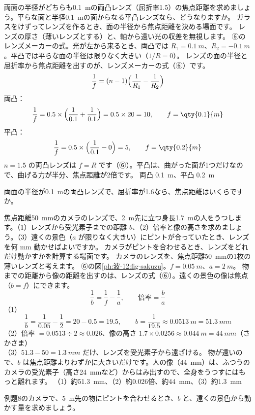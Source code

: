 \label{ph:波-12:ex7}
\begin{phreidai}[両凸レンズの焦点距離]
両面の半径がどちらも\qty{0.1}{m}の両凸レンズ（屈折率1.5）の焦点距離を求めましょう。平らな面と半径\qty{0.1}{m}の面からなる平凸レンズなら、どうなりますか。
\phbamen
ガラスをけずってレンズを作るとき、面の半径から焦点距離を決める場面です。
\phmushi
レンズの厚さ（薄いレンズとする）と、軸から遠い光の収差を無視します。
\phzu
⑥のレンズメーカーの式。光が左から来るとき、両凸では $R_1=\qty{0.1}{m}$、$R_2=\qty{-0.1}{m}$。平凸では平らな面の半径は限りなく大きい（$1/R=0$）。
\phriyu
レンズの面の半径と屈折率から焦点距離を出すのが、レンズメーカーの式（⑥）です。
\phtateru
\[\frac1f=(n-1)\Bigl(\frac1{R_1}-\frac1{R_2}\Bigr)\]
\phtoku
両凸：\[\frac1f=0.5\times\Bigl(\frac1{0.1}+\frac1{0.1}\Bigr)=0.5\times20=10,\qquad f=\qty{0.1}{m}\]
平凸：\[\frac1f=0.5\times\Bigl(\frac1{0.1}-0\Bigr)=5,\qquad f=\qty{0.2}{m}\]
\phtashikame
$n=1.5$ の両凸レンズは $f=R$ です（⑥）。平凸は、曲がった面が1つだけなので、曲げる力が半分、焦点距離が2倍です。
\kotae 両凸 \qty{0.1}{m}、平凸 \qty{0.2}{m}
\end{phreidai}
\begin{jibun}
両面の半径が\qty{0.1}{m}の両凸レンズで、屈折率が1.6なら、焦点距離はいくらですか。
\end{jibun}

\label{ph:波-12:ex8}
\begin{phreidai}[カメラのピント合わせ]
焦点距離\qty{50}{mm}のカメラのレンズで、\qty{2}{m}先に立つ身長\qty{1.7}{m}の人をうつします。（1）レンズから受光素子までの距離 $b$、（2）倍率と像の高さを求めましょう。（3）遠くの景色（$a$ が限りなく大きい）にピントが合っていたとき、レンズを何 mm 動かせばよいですか。
\phbamen
カメラがピントを合わせるとき、レンズをどれだけ動かすかを計算する場面です。
\phmushi
カメラのレンズを、焦点距離\qty{50}{mm}の1枚の薄いレンズと考えます。
\phzu
⑥の図\ref{ph:波-12:fig-sakuzu}。$f=\qty{0.05}{m}$、$a=\qty{2}{m}$。
\phriyu
物までの距離から像の距離を出すのは、レンズの式（⑥）。遠くの景色の像は焦点（$b=f$）にできます。
\phtateru
\[\frac1b=\frac1f-\frac1a,\qquad\text{倍率}=\frac ba\]
\phtoku
（1）\[\frac1b=\frac1{0.05}-\frac12=20-0.5=19.5,\qquad b=\frac{1}{19.5}\approx\qty{0.0513}{m}=\qty{51.3}{mm}\]
（2）倍率 $=0.0513\div2\approx0.026$、像の高さ $1.7\times0.0256\approx\qty{0.044}{m}=\qty{44}{mm}$（さかさま）\\
（3）$51.3-50=\qty{1.3}{mm}$ だけ、レンズを受光素子から遠ざける。
\phtashikame
物が遠いので、$b$ は焦点距離よりわずかに大きいだけです。人の像（\qty{44}{mm}）は、ふつうのカメラの受光素子（高さ\qty{24}{mm}など）からはみ出すので、全身をうつすにはもっと離れます。
\kotae （1）約\qty{51.3}{mm}、（2）約0.026倍、約\qty{44}{mm}、（3）約\qty{1.3}{mm}
\end{phreidai}
\begin{jibun}
例題8のカメラで、\qty{5}{m}先の物にピントを合わせるとき、$b$ と、遠くの景色から動かす量を求めましょう。
\end{jibun}

